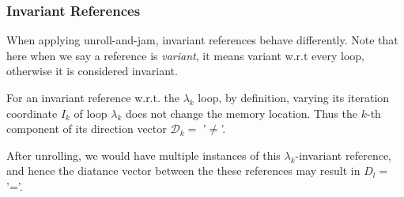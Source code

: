 %
%
%

\subsubsection{Invariant References}
When applying unroll-and-jam, invariant references behave differently. Note that
here when we say a reference is \textit{variant}, it means variant w.r.t every loop,
otherwise it is considered invariant.

For an invariant reference w.r.t. the $\lambda_{k}$ loop, by definition, varying its
iteration coordinate $I_k$ of loop $\lambda_k$ does not change the memory location. Thus
the $k$-th component of its direction vector $\mathcal{D}_{k} =$ '$\neq$'.

After unrolling, we would have multiple instances of this $\lambda_k$-invariant reference, and
hence the diatance vector between the these references may result in $D_{l}=$ '='.

